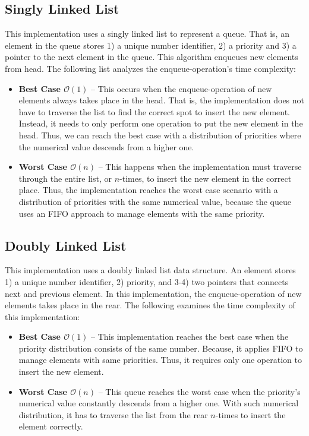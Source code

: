 \documentclass[a4paper,11pt]{kth-mag}
\begin{document}
\subsection{Singly Linked List}\label{sec:singly}
This implementation uses a singly linked list to represent a queue.
That is, an element in the queue stores 1) a unique number identifier, 2) a priority and 3) a pointer to the next element in the queue.
This algorithm enqueues new elements from head.
The following list analyzes the enqueue-operation's time complexity:
\begin{itemize}
    \item \textbf{Best Case $\mathcal{O}(1)$} -- This occurs when the enqueue-operation of new elements always takes place in the head.
        That is, the implementation does not have to traverse the list to find the correct spot to insert the new element.
        Instead, it needs to only perform one operation to put the new element in the head.
        Thus, we can reach the best case with a distribution of priorities where the numerical value descends from a higher one.
    \item \textbf{Worst Case $\mathcal{O}(n)$} -- This happens when the implementation must traverse through the entire list, or $n$-times, to insert the new element in the correct place.
        Thus, the implementation reaches the worst case scenario with a distribution of priorities with the same numerical value,
because the queue uses an FIFO approach to manage elements with the same priority.
\end{itemize}

\subsection{Doubly Linked List}
This implementation uses a doubly linked list data structure.
An element stores 1) a unique number identifier, 2) priority, and 3-4) two pointers that connects next and previous element.
In this implementation, the enqueue-operation of new elements takes place in the rear.
The following examines the time complexity of this implementation:
\begin{itemize}
    \item \textbf{Best Case $\mathcal{O}(1)$} -- This implementation reaches the best case when the priority distribution consists of the same number.
        Because, it applies FIFO to manage elements with same priorities.
        Thus, it requires only one operation to insert the new element.
    \item \textbf{Worst Case $\mathcal{O}(n)$} -- This queue reaches the worst case when the priority's numerical value constantly descends from a higher one.
        With such numerical distribution, it has to traverse the list from the rear $n$-times to insert the element correctly.
\end{itemize}
\end{document}
